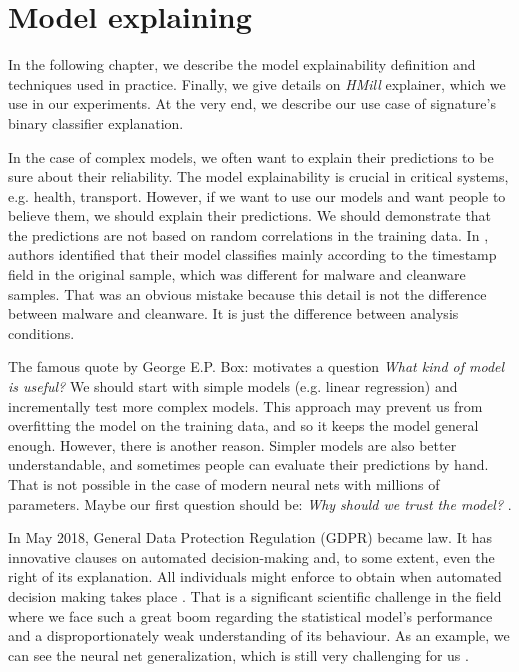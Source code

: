 \chapter{Model explaining} \label{chap:expth}
In the following chapter, we describe the model explainability definition and techniques used in practice. Finally, we give details on \emph{HMill} explainer, which we use in our experiments. At the very end, we describe our use case of signature's binary classifier explanation.

In the case of complex models, we often want to explain their predictions to be sure about their reliability. The model explainability is crucial in critical systems, e.g. health, transport. However, if we want to use our models and want people to believe them, we should explain their predictions. We should demonstrate that the predictions are not based on random correlations in the training data. In \cite{Pevny2020}, authors identified that their model classifies mainly according to the timestamp field in the original sample, which was different for malware and cleanware samples. That was an obvious mistake because this detail is not the difference between malware and cleanware. It is just the difference between analysis conditions.

The famous quote by George E.P. Box:  motivates a question \emph{What kind of model is useful?} We should start with simple models (e.g. linear regression) and incrementally test more complex models. This approach may prevent us from overfitting the model on the training data, and so it keeps the model general enough. However, there is another reason. Simpler models are also better understandable, and sometimes people can evaluate their predictions by hand. That is not possible in the case of modern neural nets with millions of parameters. Maybe our first question should be: \emph{Why should we trust the model?} \cite{Ribeiro2016}.

In May 2018, General Data Protection Regulation (GDPR) became law. It has innovative clauses on automated decision-making and, to some extent, even the right of its explanation. All individuals might enforce to obtain  when automated decision making takes place \cite{Guidotti2018}. That is a significant scientific challenge in the field where we face such a great boom regarding the statistical model's performance and a disproportionately weak understanding of its behaviour. As an example, we can see the neural net generalization, which is still very challenging for us \cite{Zhang2016}.

